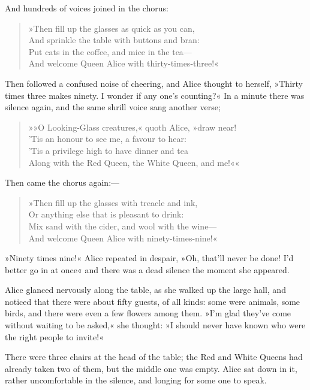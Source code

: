 And hundreds of voices joined in the chorus:

\begin{verse}
»Then fill up the glasses as quick as you can,\\
\vin And sprinkle the table with buttons and bran:\\
Put cats in the coffee, and mice in the tea—\\
\vin And welcome Queen Alice with thirty-times-three!«
\end{verse}

Then followed a confused noise of cheering, and Alice thought to herself, »Thirty times three makes ninety. I wonder if any one's counting?« In a minute there was silence again, and the same shrill voice sang another verse;

\begin{verse}
»»O Looking-Glass creatures,« quoth Alice, »draw near!\\
\vin 'Tis an honour to see me, a favour to hear:\\
'Tis a privilege high to have dinner and tea\\
\vin Along with the Red Queen, the White Queen, and me!««
\end{verse}

Then came the chorus again:—

\begin{verse}
»Then fill up the glasses with treacle and ink,\\
\vin Or anything else that is pleasant to drink:\\
Mix sand with the cider, and wool with the wine—\\
\vin And welcome Queen Alice with ninety-times-nine!«
\end{verse}

»Ninety times nine!« Alice repeated in despair, »Oh, that'll never be done! I'd better go in at once\longdash« and there was a dead silence the moment she appeared.

Alice glanced nervously along the table, as she walked up the large hall, and noticed that there were about fifty guests, of all kinds: some were animals, some birds, and there were even a few flowers among them. »I'm glad they've come without waiting to be asked,« she thought: »I should never have known who were the right people to invite!«

There were three chairs at the head of the table; the Red and White Queens had already taken two of them, but the middle one was empty. Alice sat down in it, rather uncomfortable in the silence, and longing for some one to speak.


